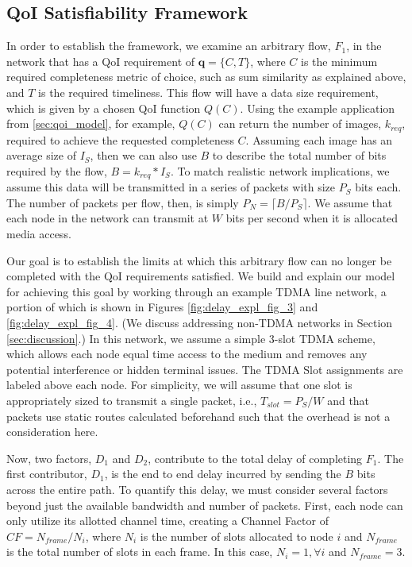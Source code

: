 \subsection{QoI Satisfiability Framework}
In order to establish the framework, we examine an arbitrary flow, $F_1$, in the network that has a QoI requirement of $\mathbf{q} = \{C, T\}$, where $C$ is the minimum required completeness metric of choice, such as sum similarity as explained above, and $T$ is the required timeliness.  This flow will have a data size requirement, which is given by a chosen QoI function $Q(C)$.  Using the example application from \ref{sec:qoi_model}, for example, $Q(C)$ can return the number of images, $k_{req}$, required to achieve the requested completeness $C$. %
Assuming each image has an average size of $I_S$, then we can also use $B$ to describe the total number of bits required by the flow, $B=k_{req}*I_S$.  To match realistic network implications, we assume this data will be transmitted in a series of packets with size $P_S$ bits each.  The number of packets per flow, then, is simply $P_N = \lceil B/P_S \rceil$.  We assume that each node in the network can transmit at $W$ bits per second when it is allocated media access.

Our goal is to establish the limits at which this arbitrary flow can no longer be completed with the QoI requirements satisfied.  We build and explain our model for achieving this goal by working through an example TDMA line network, a portion of which is shown in Figures \ref{fig:delay_expl_fig_3} and \ref{fig:delay_expl_fig_4}.  (We discuss addressing non-TDMA networks in Section \ref{sec:discussion}.)  In this network, we assume a simple 3-slot TDMA scheme, which allows each node equal time access to the medium and removes any potential interference or hidden terminal issues.  The TDMA Slot assignments are labeled above each node.  For simplicity, we will assume that one slot is appropriately sized to transmit a single packet, i.e., $T_{slot} = P_S/W$ and that packets use static routes calculated beforehand such that the overhead is not a consideration here.

Now, two factors, $D_1$ and $D_2$, contribute to the total delay of completing $F_1$.  The first contributor, $D_1$, is the end to end delay incurred by sending the $B$ bits across the entire path.  To quantify this delay, we must consider several factors beyond just the available bandwidth and number of packets.  First, each node can only utilize its allotted channel time, creating a Channel Factor of $CF = N_{frame}/N_{i}$, where $N_{i}$ is the number of slots allocated to node $i$ and $N_{frame}$ is the total number of slots in each frame.  In this case, $N_{i} = 1, \forall i$ and $N_{frame} = 3$.  

